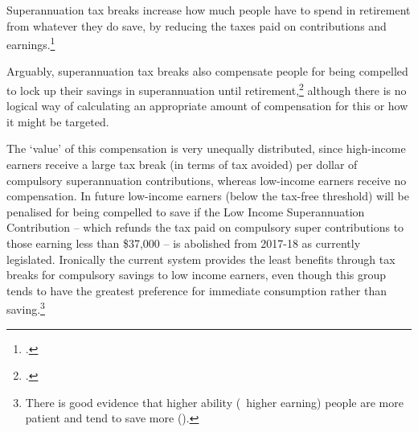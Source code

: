 Superannuation tax breaks increase how much people have to spend in retirement from whatever they do save, by reducing the taxes paid on contributions and earnings.\footcite{Keating2015}  

Arguably, superannuation tax breaks also compensate people for being compelled to lock up their savings in superannuation until retirement,\footcite{Hockey2015IGR} although there is no logical way of calculating an appropriate amount of compensation for this or how it might be targeted. 

The ‘value’ of this compensation is very unequally distributed, since high-income earners receive a large tax break (in terms of tax avoided) per dollar of compulsory superannuation contributions, whereas low-income earners receive no compensation. In future low-income earners (below the tax-free threshold) will be penalised for being compelled to save if the Low Income Superannuation Contribution – which refunds the tax paid on compulsory super contributions to those earning less than \$37,000  – is abolished from 2017-18 as currently legislated. Ironically the current system provides the least benefits through tax breaks for compulsory savings to low income earners, even though this group tends to have the greatest preference for immediate consumption rather than saving.\footnote{There is good evidence that higher ability (\ie~higher earning) people are more patient and tend to save more (\textcite[][616--623]{BanksDiamond2010}).} 


